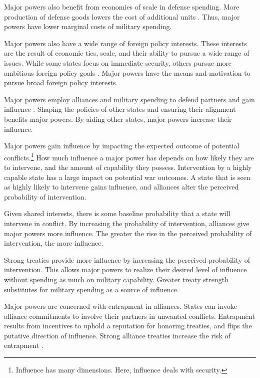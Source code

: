 \documentclass[12pt]{article}
\begin{document}
Major powers also benefit from economies of scale in defense spending. 
More production of defense goods lowers the cost of additional units \citep{Moravcsik1991, AlesinaSpolaore2006}. 
Thus, major powers have lower marginal costs of military spending.  


Major powers also have a wide range of foreign policy interests.
These interests are the result of economic ties, scale, and their ability to pursue a wide range of issues. 
While some states focus on immediate security, others pursue more ambitious foreign policy goals \citep{Fordham2011, MarkowitzFariss2017}. 
Major powers have the means and motivation to pursue broad foreign policy interests.  


Major powers employ alliances and military spending to defend partners and gain influence \citep{Morrow1991}. 
Shaping the policies of other states and ensuring their alignment benefits major powers. 
By aiding other states, major powers increase their influence. 


Major powers gain influence by impacting the expected outcome of potential conflicts.\footnote{Influence has many dimensions. Here, influence deals with security.} 
How much influence a major power has depends on how likely they are to intervene, and the amount of capability they possess. 
Intervention by a highly capable state has a large impact on potential war outcomes. 
A state that is seen as highly likely to intervene gains influence, and alliances alter the perceived probability of intervention. 


Given shared interests, there is some baseline probability that a state will intervene in conflict. 
By increasing the probability of intervention, alliances give major powers more influence. 
The greater the rise in the perceived probability of intervention, the more influence.


Strong treaties provide more influence by increasing the perceived probability of intervention. 
This allows major powers to realize their desired level of influence without spending as much on military capability. 
Greater treaty strength substitutes for military spending as a source of influence.  


Major powers are concerned with entrapment in alliances. 
States can invoke alliance commitments to involve their partners in unwanted conflicts. 
Entrapment results from incentives to uphold a reputation for honoring treaties, and flips the putative direction of influence. 
Strong alliance treaties increase the risk of entrapment \citep{Snyder1997, Benson2012, Yarhi-Miloetal2016}.
\end{document}
